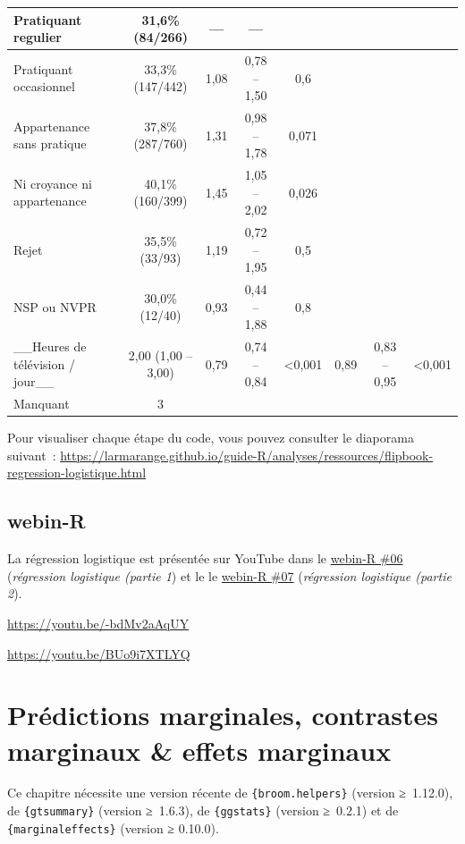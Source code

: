 \documentclass[
  letterpaper,
  DIV=11,
  numbers=noendperiod,
  oneside]{scrreprt}
\begin{document}
\begin{table}
\begin{tabular}{l|c|c|c|c|c|c|c}
\hline
Pratiquant regulier & 31,6\% (84/266) & — & — &  &  &  & \\
\hline
Pratiquant occasionnel & 33,3\% (147/442) & 1,08 & 0,78 – 1,50 & 0,6 &  &  & \\
\hline
Appartenance sans pratique & 37,8\% (287/760) & 1,31 & 0,98 – 1,78 & 0,071 &  &  & \\
\hline
Ni croyance ni appartenance & 40,1\% (160/399) & 1,45 & 1,05 – 2,02 & 0,026 &  &  & \\
\hline
Rejet & 35,5\% (33/93) & 1,19 & 0,72 – 1,95 & 0,5 &  &  & \\
\hline
NSP ou NVPR & 30,0\% (12/40) & 0,93 & 0,44 – 1,88 & 0,8 &  &  & \\
\hline
\_\_Heures de télévision / jour\_\_ & 2,00 (1,00 – 3,00) & 0,79 & 0,74 – 0,84 & <0,001 & 0,89 & 0,83 – 0,95 & <0,001\\
\hline
Manquant & 3 &  &  &  &  &  & \\
\hline
\end{tabular}
\end{table}

Pour visualiser chaque étape du code, vous pouvez consulter le diaporama
suivant~:
\url{https://larmarange.github.io/guide-R/analyses/ressources/flipbook-regression-logistique.html}

\hypertarget{webin-r-7}{%
\section{webin-R}\label{webin-r-7}}

La régression logistique est présentée sur YouTube dans le
\href{https://youtu.be/-bdMv2aAqUY}{webin-R \#06} (\emph{régression
logistique (partie 1}) et le le
\href{https://youtu.be/BUo9i7XTLYQ}{webin-R \#07} (\emph{régression
logistique (partie 2}).

\url{https://youtu.be/-bdMv2aAqUY}

\url{https://youtu.be/BUo9i7XTLYQ}

\hypertarget{sec-estimations-marginales}{%
\chapter{Prédictions marginales, contrastes marginaux \& effets
marginaux}\label{sec-estimations-marginales}}

\begin{tcolorbox}[enhanced jigsaw, colbacktitle=quarto-callout-warning-color!10!white, opacityback=0, toprule=.15mm, colback=white, coltitle=black, bottomtitle=1mm, toptitle=1mm, titlerule=0mm, rightrule=.15mm, title=\textcolor{quarto-callout-warning-color}{\faExclamationTriangle}\hspace{0.5em}{Avertissement}, breakable, bottomrule=.15mm, opacitybacktitle=0.6, arc=.35mm, left=2mm, leftrule=.75mm, colframe=quarto-callout-warning-color-frame]

Ce chapitre nécessite une version récente de \texttt{\{broom.helpers\}}
(version ≥~1.12.0), de \texttt{\{gtsummary\}} (version ≥~1.6.3), de
\texttt{\{ggstats\}} (version ≥~0.2.1) et de
\texttt{\{marginaleffects\}} (version ≥ 0.10.0).

\end{tcolorbox}
\end{document}

